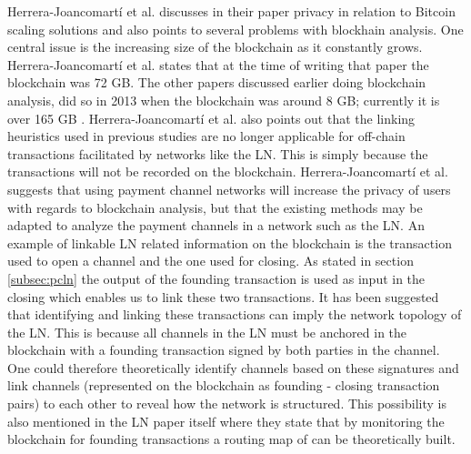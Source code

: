 Herrera-Joancomartí et al. discusses in their paper \cite{herrera2016privacy} privacy in relation to Bitcoin scaling solutions and also points to several problems with blockhain analysis. One central issue is the increasing size of the blockchain as it constantly grows. Herrera-Joancomartí et al. states that at the time of writing that paper the blockchain was 72 GB. The other papers discussed earlier doing blockchain analysis, did so in 2013 when the blockchain was around 8 GB; currently it is over 165 GB \cite{blockchain_size}. 
Herrera-Joancomartí et al. also points out that the linking heuristics used in previous studies are no longer applicable for off-chain transactions facilitated by networks like the LN. This is simply because the transactions will not be recorded on the blockchain. Herrera-Joancomartí et al. suggests that using payment channel networks will increase the privacy of users with regards to blockchain analysis, but that the existing methods may be adapted to analyze the payment channels in a network such as the LN. 
An example of linkable LN related information on the blockchain is the transaction used to open a channel and the one used for closing. As stated in section \ref{subsec:pcln} the output of the founding transaction is used as input in the closing which enables us to link these two transactions. It has been suggested that identifying and linking these transactions can imply the network topology \cite{rusty_routing1} of the LN. This is because all channels in the LN must be anchored in the blockchain with a founding transaction signed by both parties in the channel. One could therefore theoretically identify channels based on these signatures and link channels (represented on the blockchain as founding - closing transaction pairs) to each other to reveal how the network is structured. This possibility is also mentioned in the LN paper itself \cite{poon2015bitcoin} where they state that by monitoring the blockchain for founding transactions a routing map of can be theoretically built. 
\\




